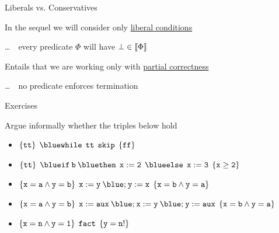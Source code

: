 \documentclass{beamer}
\begin{document}
\begin{frame}{Liberals vs. Conservatives}

        In the sequel we will consider only \alert{\underline{liberal conditions}}

        \dots \, \ie\ every predicate $\Phi$ will have $\bot \in \llbracket \Phi \rrbracket$

        \bigskip
        Entails that we are working only with \alert{\underline{partial correctness}}

        \dots \, \ie\ no predicate enforces termination
\end{frame}

\begin{frame}{Exercises}

        Argue informally whether the triples below hold
        \\[7pt]
        \begin{itemize}
                \item $\{ \prog{tt} \} \> \> \prog{{\blue while} \> \> tt \> \> skip} \> \> \{ \prog{ff} \}$
                        \\[7pt]
                \item $\{ \prog{tt} \} \> \> \prog{{\blue if} \>  b \> {\blue then} \> \> 
                        x:=2 \> \> {\blue else} \> \> x:= 3} \> \> \{ \prog{x \geq 2} \}$
                        \\[7pt]
                \item $\{ \prog{x = a \wedge y = b} \} \> \>
                        \prog{x:= y \> {\blue ;} \> y := x} \> \> \{ \prog{ x = b \wedge y = a }\}$
                        \\[7pt]
                \item $\{ \prog{x = a \wedge y = b} \} \> \>
                        \prog{x:= aux \> {\blue ;} \> 
                        x:= y \> {\blue ;} \> y := aux} \> \> \{ \prog{ x = b \wedge y = a }\}$
                        \\[7pt]
                \item $\{ \mathtt{x =n \wedge y = 1} \} \> \> \mathtt{fact} \> \> \{ \mathtt{y = n!} \}$
        \end{itemize}
\end{frame}



\end{document}
